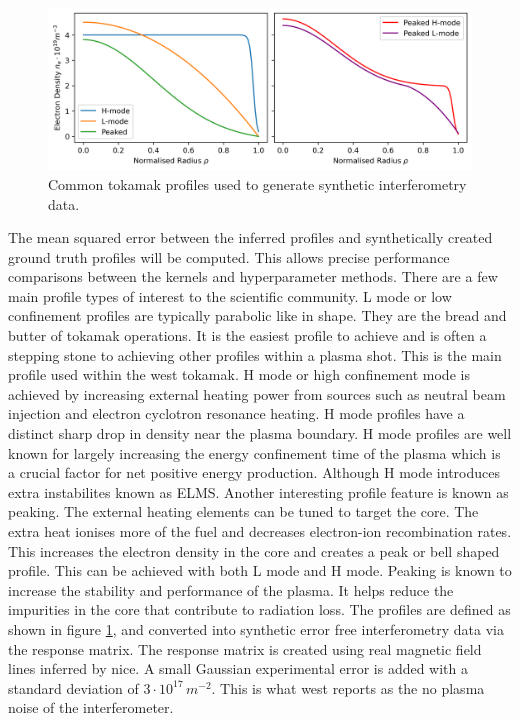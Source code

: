 \begin{figure}[H]
    \centering
    \includegraphics[width=\textwidth]{images/syntheticProfiles.png}
    \caption{Common tokamak profiles used to generate synthetic interferometry data.}
    \label{fig:groundtruth}
\end{figure}

The mean squared error between the inferred profiles and synthetically created ground truth profiles will be computed. This allows precise performance comparisons between the kernels and hyperparameter methods. There are a few main profile types of interest to the scientific community. L mode or low confinement profiles are typically parabolic like in shape. They are the bread and butter of tokamak operations. It is the easiest profile to achieve and is often a stepping stone to achieving other profiles within a plasma shot. This is the main profile used within the \gls{west} tokamak. H mode or high confinement mode is achieved by increasing external heating power from sources such as neutral beam injection and electron cyclotron resonance heating. H mode profiles have a distinct sharp drop in density near the plasma boundary. H mode profiles are well known for largely increasing the energy confinement time of the plasma which is a crucial factor for net positive energy production. Although H mode introduces extra instabilites known as ELMS. Another interesting profile feature is known as peaking. The external heating elements can be tuned to target the core. The extra heat ionises more of the fuel and decreases electron-ion recombination rates. This increases the electron density in the core and creates a peak or bell shaped profile. This can be achieved with both L mode and H mode. Peaking is known to increase the stability and performance of the plasma. It helps reduce the impurities in the core that contribute to radiation loss. The profiles are defined as shown in figure \ref{fig:groundtruth}, and converted into synthetic error free interferometry data via the response matrix. The response matrix is created using real magnetic field lines inferred by \gls{nice}. A small Gaussian experimental error is added with a standard deviation of $3\cdot10^{17} \, m^{-2}$. This is what \gls{west} reports as the no plasma noise of the interferometer.

